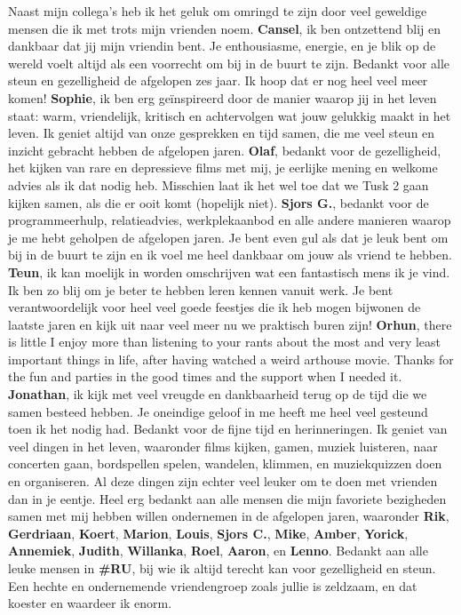 Naast mijn collega's heb ik het geluk om omringd te zijn door veel geweldige mensen die ik met trots mijn vrienden noem. \newline
\textbf{Cansel}, ik ben ontzettend blij en dankbaar dat jij mijn vriendin bent. Je enthousiasme, energie, en je blik op de wereld voelt altijd als een voorrecht om bij in de buurt te zijn. Bedankt voor alle steun en gezelligheid de afgelopen zes jaar. Ik hoop dat er nog heel veel meer komen! \newline 
\textbf{Sophie}, ik ben erg ge\"{i}nspireerd door de manier waarop jij in het leven staat: warm, vriendelijk, kritisch en achtervolgen wat jouw gelukkig maakt in het leven. Ik geniet altijd van onze gesprekken en tijd samen, die me veel steun en inzicht gebracht hebben de afgelopen jaren. \newline 
\textbf{Olaf}, bedankt voor de gezelligheid, het kijken van rare en depressieve films met mij, je eerlijke mening en welkome advies als ik dat nodig heb. Misschien laat ik het wel toe dat we Tusk 2 gaan kijken samen, als die er ooit komt (hopelijk niet). \newline
\textbf{Sjors G.}, bedankt voor de programmeerhulp, relatieadvies, werkplekaanbod en alle andere manieren waarop je me hebt geholpen de afgelopen jaren. Je bent even gul als dat je leuk bent om bij in de buurt te zijn en ik voel me heel dankbaar om jouw als vriend te hebben. \newline 
\textbf{Teun}, ik kan moelijk in worden omschrijven wat een fantastisch mens ik je vind. Ik ben zo blij om je beter te hebben leren kennen vanuit werk. Je bent verantwoordelijk voor heel veel goede feestjes die ik heb mogen bijwonen de laatste jaren en kijk uit naar veel meer nu we praktisch buren zijn! \newline
\textbf{Orhun}, there is little I enjoy more than listening to your rants about the most and very least important things in life, after having watched a weird arthouse movie. Thanks for the fun and parties in the good times and the support when I needed it. \newline 
\textbf{Jonathan}, ik kijk met veel vreugde en dankbaarheid terug op de tijd die we samen besteed hebben. Je oneindige geloof in me heeft me heel veel gesteund toen ik het nodig had. Bedankt voor de fijne tijd en herinneringen. \newline 
Ik geniet van veel dingen in het leven, waaronder films kijken, gamen, muziek luisteren, naar concerten gaan, bordspellen spelen, wandelen, klimmen, en muziekquizzen doen en organiseren. Al deze dingen zijn echter veel leuker om te doen met vrienden dan in je eentje. Heel erg bedankt aan alle mensen die mijn favoriete bezigheden samen met mij hebben willen ondernemen in de afgelopen jaren, waaronder \textbf{Rik}, \textbf{Gerdriaan}, \textbf{Koert}, \textbf{Marion}, \textbf{Louis}, \textbf{Sjors C.}, \textbf{Mike}, \textbf{Amber}, \textbf{Yorick}, \textbf{Annemiek}, \textbf{Judith}, \textbf{Willanka}, \textbf{Roel}, \textbf{Aaron}, en \textbf{Lenno}. \newline
Bedankt aan alle leuke mensen in \textbf{\#RU}, bij wie ik altijd terecht kan voor gezelligheid en steun. Een hechte en ondernemende vriendengroep zoals jullie is zeldzaam, en dat koester en waardeer ik enorm.

